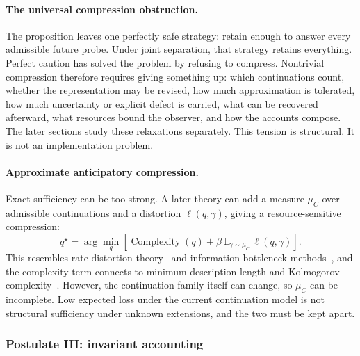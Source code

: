 \paragraph{The universal compression obstruction.}




The proposition leaves one perfectly safe strategy: retain enough to
answer every admissible future probe. Under joint separation, that
strategy retains everything. Perfect caution has solved the problem
by refusing to compress. Nontrivial compression therefore requires
giving something up: which continuations count, whether the
representation may be revised, how much approximation is tolerated,
how much uncertainty or explicit defect is carried, what can be
recovered afterward, what resources bound the observer, and how the
accounts compose. The later sections study these relaxations
separately. This tension
is structural. It is not an implementation problem.

\paragraph{Approximate anticipatory compression.}

Exact sufficiency can be too strong. A later theory can add a measure
$\mu_C$ over admissible continuations and a distortion
$\ell(q, \gamma)$, giving a resource-sensitive compression:
\begin{equation}
  q^{\star} = \arg\min_q \left[ \operatorname{Complexity}(q)
  + \beta\, \mathbb{E}_{\gamma \sim \mu_C}\, \ell(q, \gamma) \right].\label{eq:approx-compression}
\end{equation}
This resembles rate-distortion theory~\cite{shannon1959coding} and
information bottleneck methods~\cite{tishby1999information}, and the
complexity term connects to minimum description length and Kolmogorov
complexity~\cite{rissanen1978modeling,li2008introduction}. However,
the continuation family itself can change, so
$\mu_C$ can be incomplete. Low expected loss under the current
continuation model is not structural sufficiency under unknown
extensions, and the two must be kept apart.

\subsubsection{Postulate III: invariant accounting}

